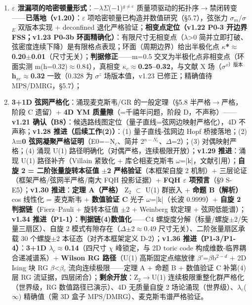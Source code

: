\documentclass[UTF8,fontset=windows]{csoarticle}
\newcommand{\up}[1]{\ensuremath{^{#1}}}
\newcommand{\down}[1]{\ensuremath{_{#1}}}
\begin{document}
\begin{enumerate}
\item \textbf{\ensuremath{\varepsilon} 泄漏项的哈密顿量形式}：\ensuremath{-}\ensuremath{\lambda}\ensuremath{\Sigma}(\ensuremath{-}1)\up{g\neq{}e} 质量项驱动的拓扑序\ensuremath{\to}禁闭转变------\textbf{\checkmark 已落地（v1.20）}：\ensuremath{\varepsilon} 项哈密顿量已构造并数值研究（\S{}5.7），弦张力 \ensuremath{\sigma}\down{m}/\ensuremath{\sigma}\down{E} 双版本实现 + deconfined 退化严格验证；\textbf{\checkmark 相变点定位（v1.22 P0-3 开边界 FSS；v1.23 P0-3b 环面精确化）}：有限尺寸无相变点（\ensuremath{\lambda}>0 简并立即打破、弦密度连续下降）是有限格点表现；环面（周期边界）给出半极化点 \textbf{\ensuremath{\kappa}*\ensuremath{\approx}0.20\ensuremath{\pm}0.01}（尺寸无关）；\textbf{判据修正}------m=0.5 交叉为半极化点非相变点（环面实测 m(h=0.32)\ensuremath{\approx}0.84），真相变 \textbf{\ensuremath{\kappa}\down{c}\ensuremath{\approx}0.25--0.32}，与文献 X 场（\ensuremath{\sigma}\up{x）版本} \textbf{h\down{xc}\ensuremath{\approx}0.32} 一致（0.328 为 \ensuremath{\sigma}\up{z} 场版本值，v1.23 已修正；精确值待 MPS/DMRG，\S{}5.7）；
\item \textbf{3+1D 弦网严格化}：涌现麦克斯韦/GR 的一般定理（\S{}5.8 半严格\ensuremath{\to}严格，阶段 C 遗留）+ \textbf{4D YM 质量隙}（=千禧年问题，阶段 D，不声称）------\textbf{v1.21 确认（B8）}：候选路线图定位（量子直线=弦网边映射严格化），4D 不声称；\textbf{v1.28 推进（后续工作(2)）}：(1) 量子直线-弦网边 Hopf 桥接落地；(2) \textbf{\ensuremath{\lambda}=0 弦网凝聚严格证明}（E0=\ensuremath{-}N\down{c}、简并 2\up{n-N\down{c}}、\ensuremath{\Delta}=2）；(3) 对偶映射严格；(4) 涌现 U(1) 路径明确化（对偶严格，连续极限开放）；\textbf{v1.29 推进}：涌现 U(1) 路径补齐（Villain 紧致化 + 库仑相麦克斯韦 \ensuremath{\omega}=|k|，文献引用）；\textbf{自旋 2 = 二阶张量旋转本征值 \ensuremath{\pm}2 严格验证}（本框架自旋 2 机制）+ 三层论证（框架严格/弦网半严格/南大 FQH 投影证据）+ \textbf{FQH \ensuremath{\varepsilon} 项预言}（\S{}9 S-E5）；\textbf{v1.30 推进}：\textbf{定理 A（严格）} Z\down{2} \ensuremath{\subset} U(1) 群嵌入 + \textbf{命题 B（解析）} cos 线性化 = 麦克斯韦 + \textbf{数值验证 C} 光子 \ensuremath{\omega}=|k|（长波 0.9999）+ \textbf{自旋 2 判据链}（Fierz--Pauli + 旋转本征值 \ensuremath{\pm}2 + Weinberg 软定理 + 弦网低能谱）；\textbf{v1.34 推进（P1-1）}：\textbf{判据链(4)数值化}------C4 螺旋度分解（标量/螺旋\ensuremath{\pm}2/矢量三扇区）、自旋 2 模式有隙存在（\ensuremath{\Delta}\ensuremath{\pm}2\ensuremath{\approx}0.49 尺寸无关）、二阶张量扇区承载 30 个螺旋\ensuremath{\pm}2 本征态（对齐本框架定义 D-2）；\textbf{v1.36 推进（P1-3/P1-4）}：\textbf{3+1D \ensuremath{\lambda}\down{c}\ensuremath{\approx}0.14}（四尺寸 \ensuremath{\chi} 峰锁定，与 2D toric code 构成维数-临界耦合递减谱系）+ \textbf{Wilson RG 路径}（U(1) 高斯固定点缩放律 \ensuremath{\beta}'=\ensuremath{\beta}b\up{2-d} + 2D Ising 块 RG \ensuremath{\beta}<\ensuremath{\beta}\down{c} 流向连续极限------定理 A + 命题 B + 数值验证 C 补第(4)层 RG 流证据，四层闭合）；\textbf{剩余开放}：Z\down{2}\ensuremath{\to}U(1) 连续极限重整化群严格化（世界级，RG 数值路径已演示）、4D 无质量自旋 2 场论涌现（世界级）、\ensuremath{\lambda}\down{c}(\ensuremath{\infty}) 精确值（需 3D 盒子 MPS/DMRG）、麦克斯韦谱严格验证。
\end{enumerate}
\end{document}
